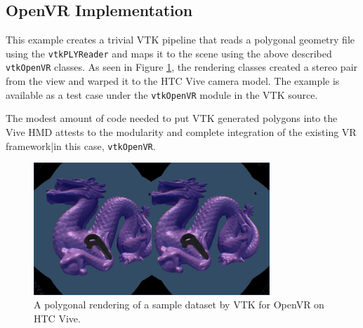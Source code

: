 
\subsection{OpenVR Implementation}

This example creates a trivial VTK pipeline that reads a polygonal geometry file
using the \texttt{vtkPLYReader} and maps it to the scene using the above described \texttt{vtkOpenVR}
classes. As seen in Figure \ref{fig:openvrdragon}, the rendering
classes created a stereo pair from the view and warped it to the HTC Vive camera model. 
The example is available as a test case under the
\texttt{vtkOpenVR} module in the VTK source.

The modest amount of code needed to put VTK generated polygons into the
Vive HMD attests to the modularity and complete integration of the
existing VR framework|in this case, \texttt{vtkOpenVR}.

\begin{figure}[h!]
  \centering
  \includegraphics[width=3.5in]{images/Dragon.jpg}
  \caption{A polygonal rendering of a sample dataset by VTK for OpenVR on HTC Vive.}
  \label{fig:openvrdragon}
\end{figure}
